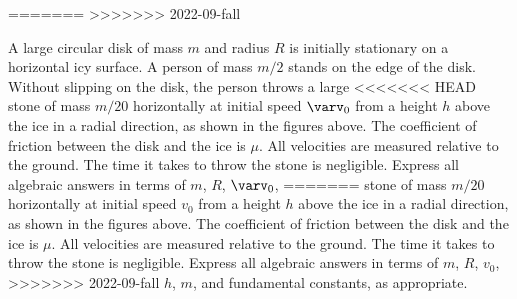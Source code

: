 \documentclass{../../oss-apphys-exam}
\begin{document}
\begin{questions}
=======
>>>>>>> 2022-09-fall

  \question A large circular disk of mass $m$ and radius $R$ is initially
  stationary on a horizontal icy surface. A person of mass $m/2$ stands on the
  edge of the disk. Without slipping on the disk, the person throws a large
<<<<<<< HEAD
  stone of mass $m/20$ horizontally at initial speed $\varv_0$ from a height
  $h$ above the ice in a radial direction, as shown in the figures above. The
  coefficient of friction between the disk and the ice is $\mu$. All velocities
  are measured relative to the ground. The time it takes to throw the stone is
  negligible. Express all algebraic answers in terms of $m$, $R$, $\varv_0$,
=======
  stone of mass $m/20$ horizontally at initial speed $v_0$ from a height
  $h$ above the ice in a radial direction, as shown in the figures above. The
  coefficient of friction between the disk and the ice is $\mu$. All velocities
  are measured relative to the ground. The time it takes to throw the stone is
  negligible. Express all algebraic answers in terms of $m$, $R$, $v_0$,
>>>>>>> 2022-09-fall
  $h$, $m$, and fundamental constants, as appropriate.
\end{questions}
\end{document}
